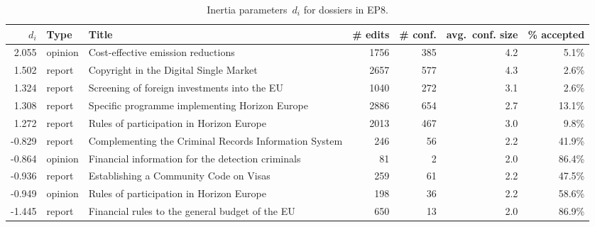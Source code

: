 


\begin{sidewaystable}
  \centering
  \caption{Inertia parameters~$d_i$ for dossiers in EP8.}
  \label{tab:inertia_params}
  \begin{tabular}{rllrrrr}
    \toprule
    $d_i$ & Type & Title & \# edits & \# conf. & avg.\ conf. size & \% accepted \\
    \midrule

    2.055 & opinion & Cost-effective emission reductions             & 1756 & 385 & 4.2 & 5.1\% \\
    1.502 & report  & Copyright in the Digital Single Market         & 2657 & 577 & 4.3 & 2.6\% \\
    1.324 & report  & Screening of foreign investments into the EU   & 1040 & 272 & 3.1 & 2.6\% \\
    1.308 & report  & Specific programme implementing Horizon Europe & 2886 & 654 & 2.7 & 13.1\% \\
    1.272 & report  & Rules of participation in Horizon Europe       & 2013 & 467 & 3.0 & 9.8\% \\

    \midrule

    -0.829 & report  & Complementing the Criminal Records Information System & 246 & 56 & 2.2 & 41.9\% \\
    -0.864 & opinion & Financial information for the detection criminals     & 81  & 2  & 2.0 & 86.4\% \\
    -0.936 & report  & Establishing a Community Code on Visas                & 259 & 61 & 2.2 & 47.5\% \\
    -0.949 & opinion & Rules of participation in Horizon Europe              & 198 & 36 & 2.2 & 58.6\% \\
    -1.445 & report  & Financial rules to the general budget of the EU       & 650 & 13 & 2.0 & 86.9\% \\

    \bottomrule
  \end{tabular}
\end{sidewaystable}

